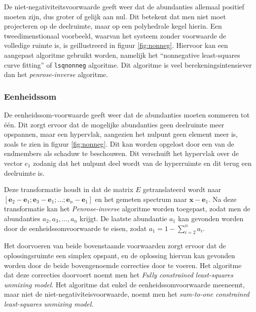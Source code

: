 \documentclass[12pt]{report}
\begin{document}
De niet-negativiteitsvoorwaarde geeft weer dat de abundanties allemaal positief moeten zijn, dus groter of gelijk aan nul. Dit betekent dat men niet moet projecteren op de deelruimte, maar op een polyhedrale kegel hierin. Een tweedimenstionaal voorbeeld, waarvan het systeem zonder voorwaarde de volledige ruimte is, is geillustreerd in figuur \ref{fig:nonneg}. Hiervoor kan een aangepast algoritme gebruikt worden, namelijk het ``nonnegative least-squares curve fitting'' of \texttt{lsqnonneg} algoritme. Dit algoritme is veel berekeningsintensiever dan het \textit{penrose-inverse} algoritme.

\subsubsection{Eenheidssom}

De eenheidssom-voorwaarde geeft weer dat de abundanties moeten sommeren tot \'e\'en. Dit zorgt ervoor dat de mogelijke abundanties geen deelruimte meer opspannen, maar een hypervlak, aangezien het nulpunt geen element meer is, zoals te zien in figuur \ref{fig:nonneg}. Dit kan worden opgelost door een van de endmembers als schaduw te beschouwen. Dit verschuift het hypervlak over de vector $e_1$ zodanig dat het nulpunt deel wordt van de hyperruimte en dit terug een deelruimte is.

Deze transformatie houdt in dat de matrix $E$ getranslateerd wordt naar $[\bm{e}_2-\bm{e}_1;\bm{e}_3-\bm{e}_1;...;\bm{e}_n-\bm{e}_1]$ en het gemeten spectrum naar $\bm{x} - \bm{e}_1$. Na deze transformatie kan het \textit{Penrose-inverse} algoritme worden toegepast, zodat men de abundanties $a_2,a_3,...,a_n$ krijgt. De laatste abundantie $a_1$ kan gevonden worden door de eenheidssomvoorwaarde te eisen, zodat $a_1 = 1 - \sum_{i=2}^{n} a_i$.

\vspace{5 mm}

Het doorvoeren van beide bovenstaande voorwaarden zorgt ervoor dat de oplossingsruimte een simplex opspant, en de oplossing hiervan kan gevonden worden door de beide bovengenoemde correcties door te voeren. Het algoritme dat deze correcties doorvoert noemt men het \textit{Fully constrained least-squares unmixing model}. Het algoritme dat enkel de eenheidssomvoorwaarde meeneemt, maar niet de niet-negativiteisvoorwaarde, noemt men het \textit{sum-to-one
constrained least-squares unmixing model}.

 
\vspace{5 mm}
\end{document}
